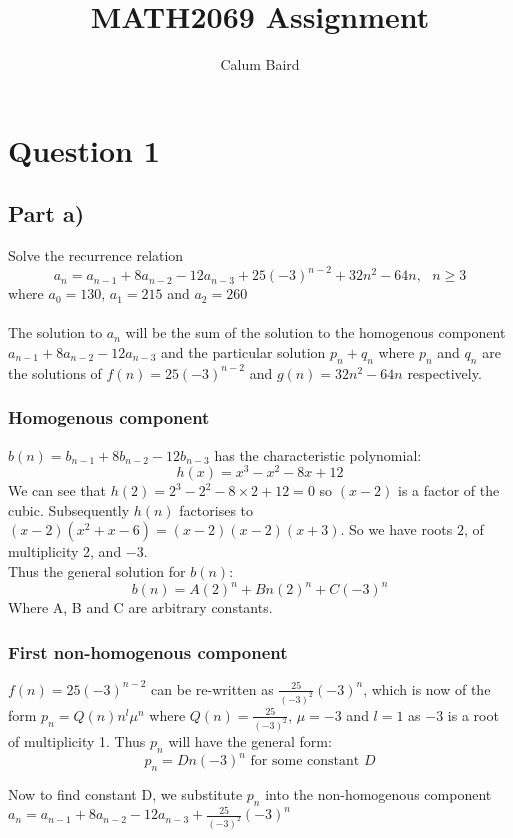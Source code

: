 \documentclass{article}
\title{MATH2069 Assignment}
\author{Calum Baird}
\begin{document}

\section{Question 1}
\subsection{Part a)}
Solve the recurrence relation
\[ a_n = a_{n-1} + 8 a_{n-2} - 12 a_{n-3} + 25(-3)^{n-2} + 32n^2 - 64n, \text{  } n \geq 3 \]
where $a_0 = 130$, $a_1 = 215$ and $a_2 = 260$
\\
\\
The solution to $a_n$ will be the sum of the solution to the homogenous component $a_{n-1} + 8a_{n-2} - 12 a_{n-3}$ and the particular solution
 $p_n + q_n$ where $p_n$ and $q_n$ are the solutions of $f(n) = 25(-3)^{n-2}$ and $g(n) = 32n^2 - 64n$ respectively.
\\
\subsubsection*{Homogenous component}
$b(n) = b_{n-1} + 8b_{n-2} - 12 b_{n-3}$ has the characteristic polynomial:
\[ h(x) = x^3 - x^2 - 8x + 12 \]
We can see that $h(2) = 2^3 - 2^2 - 8\times2 + 12 = 0$ so $(x-2)$ is a factor of the cubic.
Subsequently $h(n)$ factorises to $(x-2)(x^2+x-6) = (x-2)(x-2)(x+3)$.  So we have roots $2$, of multiplicity 2, and $-3$.
\\
Thus the general solution for $b(n)$:
\[ b(n) = A(2)^n + Bn(2)^n + C(-3)^n \]
Where A, B and C are arbitrary constants.

\subsubsection*{First non-homogenous component}
$f(n) = 25(-3)^{n-2}$ can be re-written as $\frac{25}{(-3)^2}(-3)^n$, which is now of the form $p_n = Q(n)n^l\mu^n$ where $Q(n) = \frac{25}{(-3)^2}$, $\mu = -3$
and $l=1$ as $-3$ is a root of multiplicity 1.
Thus $p_n$ will have the general form:
\[ p_n =  Dn(-3)^n \text{ for some constant } D\]

Now to find constant D, we substitute $p_n$ into the non-homogenous component $a_n = a_{n-1} + 8 a_{n-2} - 12 a_{n-3} + \frac{25}{(-3)^2}(-3)^n$
\end{document}

